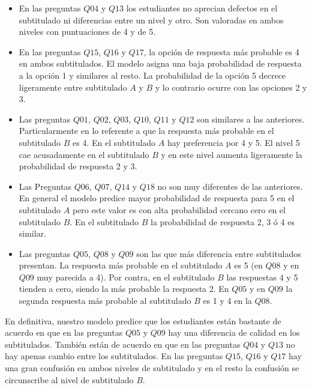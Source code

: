 \documentclass[
  12pt,
  a4paper,
  extrafontsizes,
  onecolumn,
  openright]{memoir}
\begin{document}
\begin{itemize}
\item
  En las preguntas \(Q04\) y \(Q13\) los estudiantes no aprecian
  defectos en el subtitulado ni diferencias entre un nivel y otro. Son
  valoradas en ambos niveles con puntuaciones de 4 y de 5.
\item
  En las preguntas \(Q15\), \(Q16\) y \(Q17\), la opción de respuesta
  más probable es 4 en ambos subtitulados. El modelo asigna una baja
  probabilidad de respuesta a la opción 1 y similares al resto. La
  probabilidad de la opción 5 decrece ligeramente entre subtitulado
  \(A\) y \(B\) y lo contrario ocurre con las opciones 2 y 3.
\item
  Las preguntas \(Q01\), \(Q02\), \(Q03\), \(Q10\), \(Q11\) y \(Q12\)
  son similares a las anteriores. Particularmente en lo referente a que
  la respuesta más probable en el subtitulado \(B\) es 4. En el
  subtitulado \(A\) hay preferencia por 4 y 5. El nivel 5 cae
  acusadamente en el subtitulado \(B\) y en este nivel aumenta
  ligeramente la probabilidad de respuesta 2 y 3.
\item
  Las Preguntas \(Q06\), \(Q07\), \(Q14\) y \(Q18\) no son muy
  diferentes de las anteriores. En general el modelo predice mayor
  probabilidad de respuesta para 5 en el subtitulado \(A\) pero este
  valor es con alta probabilidad cercano cero en el subtitulado \(B\).
  En el subtitulado \(B\) la probabilidad de respuesta 2, 3 ó 4 es
  similar.
\item
  Las preguntas \(Q05\), \(Q08\) y \(Q09\) son las que más diferencia
  entre subtitulados presentan. La respuesta más probable en el
  subtitulado \(A\) es 5 (en \(Q08\) y en \(Q09\) muy parecida a 4). Por
  contra, en el subtitulado \(B\) las respuestas 4 y 5 tienden a cero,
  siendo la más probable la respuesta 2. En \(Q05\) y en \(Q09\) la
  segunda respuesta más probable al subtitulado \(B\) es 1 y 4 en la
  \(Q08\).
\end{itemize}

En definitiva, nuestro modelo predice que los estudiantes están bastante
de acuerdo en que en las preguntas \(Q05\) y \(Q09\) hay una diferencia
de calidad en los subtitulados. También están de acuerdo en que en las
preguntas \(Q04\) y \(Q13\) no hay apenas cambio entre los subtitulados.
En las preguntas \(Q15\), \(Q16\) y \(Q17\) hay una gran confusión en
ambos niveles de subtitulado y en el resto la confusión se circunscribe
al nivel de subtitulado \(B\).
\end{document}
